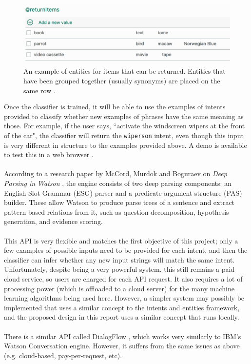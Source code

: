 \documentclass[11pt]{article}
\begin{document}
\begin{center}
\begin{figure}[H]
  \includegraphics[width=\textwidth]{returnitems.png}
  \caption{An example of entities for items that can be returned. Entities that have been grouped together (usually synonyms) are placed on the same row \cite{RefWorks:34}.}
\end{figure}
\end{center}
Once the classifier is trained, it will be able to use the examples of intents provided to classify whether new examples of phrases have the same meaning as those. For example, if the user says, ``activate the windscreen wipers at the front of the car", the classifier will return the \texttt{wipers\textunderscore on} intent, even though this input is very different in structure to the examples provided above. A demo is available to test this in a web browser \cite{RefWorks:32}.
\\
\\
According to a research paper by McCord, Murdok and Boguraev on \textit{Deep Parsing in Watson} \cite{RefWorks:112}, the engine consists of two deep parsing components: an English Slot Grammar (ESG) parser and a predicate-argument structure (PAS) builder. These allow Watson to produce parse trees of a sentence and extract pattern-based relations from it, such as question decomposition, hypothesis generation, and evidence scoring.
\\
\\
This API is very flexible and matches the first objective of this project; only a few examples of possible inputs need to be provided for each intent, and then the classifier can infer whether any new input strings will match the same intent. Unfortunately, despite being a very powerful system, this still remains a paid cloud service, so users are charged for each API request. It also requires a lot of processing power (which is offloaded to a cloud server) for the many machine learning algorithms being used here. However, a simpler system may possibly be implemented that uses a similar concept to the intents and entities framework, and the proposed design in this report uses a similar concept that runs locally.
\\
\\
There is a similar API called DialogFlow \cite{RefWorks:106}, which works very similarly to IBM's Watson Conversation engine. However, it suffers from the same issues as above (e.g. cloud-based, pay-per-request, etc).
\end{document}
